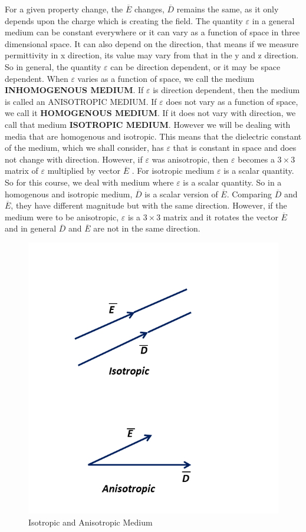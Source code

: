 For a given property change, the $\overline{E}$ changes, $\overline{D}$ remains the same, as it only depends upon the charge which is creating the field. The quantity $\varepsilon$ in a general medium can be constant everywhere or it can vary as a function of space in three dimensional space. It can also depend on the direction, that means if we measure permittivity in x direction, its value may vary from that in the y and z direction. So in general, the quantity  $\varepsilon$  can be direction dependent, or it may be space dependent. When  $\varepsilon$  varies as a function of space, we call the medium \textbf{INHOMOGENOUS MEDIUM}. If  $\varepsilon$  is direction dependent, then the medium is called an ANISOTROPIC MEDIUM. If  $\varepsilon$ does not vary as a function of space, we call it \textbf{HOMOGENOUS MEDIUM}. If it does not vary with direction, we call that medium \textbf{ISOTROPIC MEDIUM}.
However we will be dealing with media that are homogenous and isotropic. This means that the dielectric constant of the medium, which we shall consider, has  $\varepsilon$ that is constant in space and does not change with direction. However, if  $\varepsilon$  was anisotropic, then  $\varepsilon$  becomes a $3\times 3$ matrix of  $\varepsilon$  multiplied by vector $\overline{E}$ . For isotropic medium  $\varepsilon$  is a scalar quantity. So for this course, we deal with medium where  $\varepsilon$  is a scalar quantity.
So in a homogenous and isotropic medium,  $\overline{D}$ is a scalar version of  $\overline{E}$. Comparing  $\overline{D}$ and  $\overline{E}$, they have different magnitude but with the same direction. However, if the medium were to be anisotropic,  $\varepsilon$ is a $3\times 3$ matrix and it rotates the vector  $\overline{E}$ and in general  $\overline{D}$ and  $\overline{E}$ are not in the same direction.

\begin{figure}
	\centering
	\includegraphics[width=0.7\linewidth]{./graphics/isotropicAniso}
	\caption{Isotropic and Anisotropic Medium}
\end{figure}

